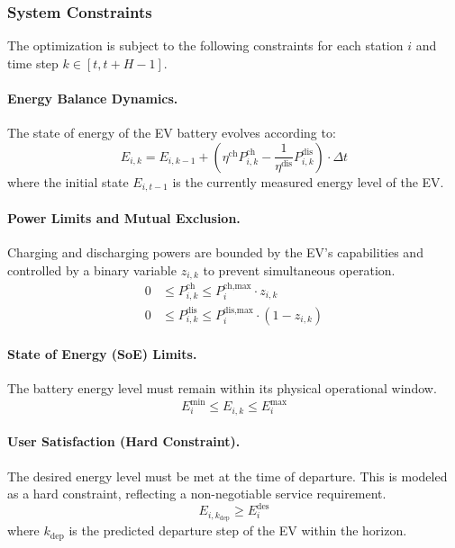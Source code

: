 \subsubsection{System Constraints}
The optimization is subject to the following constraints for each station $i$ and time step $k \in [t, t+H-1]$.

\paragraph{Energy Balance Dynamics.} The state of energy of the EV battery evolves according to:
\begin{equation}
E_{i,k} = E_{i,k-1} + \left( \eta^{\text{ch}} P^{\text{ch}}_{i,k} - \frac{1}{\eta^{\text{dis}}} P^{\text{dis}}_{i,k} \right) \cdot \Delta t
\end{equation}
where the initial state $E_{i,t-1}$ is the currently measured energy level of the EV.

\paragraph{Power Limits and Mutual Exclusion.} Charging and discharging powers are bounded by the EV's capabilities and controlled by a binary variable $z_{i,k}$ to prevent simultaneous operation.
\begin{align}
    0 &\le P^{\text{ch}}_{i,k} \le P^{\text{ch,max}}_{i} \cdot z_{i,k} \\
    0 &\le P^{\text{dis}}_{i,k} \le P^{\text{dis,max}}_{i} \cdot (1 - z_{i,k})
\end{align}

\paragraph{State of Energy (SoE) Limits.} The battery energy level must remain within its physical operational window.
\begin{equation}
E^{\text{min}}_{i} \le E_{i,k} \le E^{\text{max}}_{i}
\end{equation}

\paragraph{User Satisfaction (Hard Constraint).} The desired energy level must be met at the time of departure. This is modeled as a hard constraint, reflecting a non-negotiable service requirement.
\begin{equation}
E_{i,k_{\text{dep}}} \ge E^{\text{des}}_{i}
\end{equation}
where $k_{\text{dep}}$ is the predicted departure step of the EV within the horizon.

